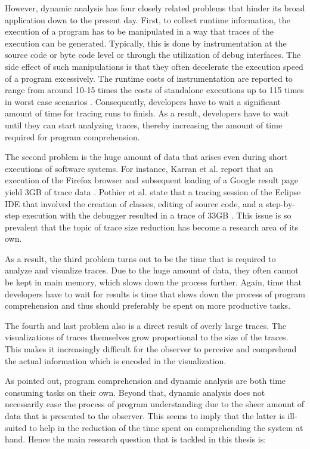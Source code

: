 However, dynamic analysis has four closely related problems that hinder its broad application down to the present day.
First, to collect runtime information, the execution of a program has to be manipulated in a way that traces of the execution can be generated.
Typically, this is done by instrumentation at the source code or byte code level or through the utilization of debug interfaces.
The side effect of such manipulations is that they often decelerate the execution speed of a program excessively.
The runtime costs of instrumentation are reported to range from around 10-15 times the costs of standalone executions up to 115 times in worst case scenarios \cite{pothier_scalable_2007, karran_synctrace:_2013}.
Consequently, developers have to wait a significant amount of time for tracing runs to finish.
As a result, developers have to wait until they can start analyzing traces, thereby increasing the amount of time required for program comprehension.

The second problem is the huge amount of data that arises even during short executions of software systems.
For instance, Karran et al. report that an execution of the Firefox browser and subsequent loading of a Google result page yield 3GB of trace data \cite{karran_synctrace:_2013}.
Pothier et al. state that a tracing session of the Eclipse IDE that involved the creation of classes, editing of source code, and a step-by-step execution with the debugger resulted in a trace of 33GB \cite{pothier_scalable_2007}.
This issue is so prevalent that the topic of trace size reduction has become a research area of its own.

As a result, the third problem turns out to be the time that is required to analyze and visualize traces.
Due to the huge amount of data, they often cannot be kept in main memory, which slows down the process further.
Again, time that developers have to wait for results is time that slows down the process of program comprehension and thus should preferably be spent on more productive tasks.

The fourth and last problem also is a direct result of overly large traces.
The visualizations of traces themselves grow proportional to the size of the traces.
This makes it increasingly difficult for the observer to perceive and comprehend the actual information which is encoded in the visualization.

As pointed out, program comprehension and dynamic analysis are both time consuming tasks on their own.
Beyond that, dynamic analysis does not necessarily ease the process of program understanding due to the sheer amount of data that is presented to the observer.
This seems to imply that the latter is ill-suited to help in the reduction of the time spent on comprehending the system at hand.
Hence the main research question that is tackled in this thesis is:

